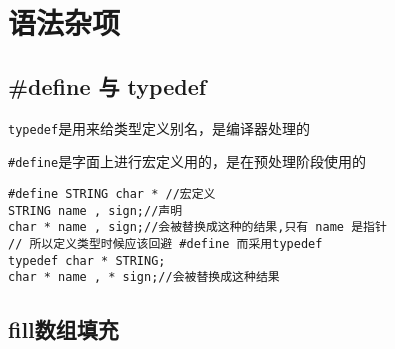 \section{语法杂项}

\subsection{#define 与 typedef}
\verb|typedef|是用来给类型定义别名，是编译器处理的

\verb|#define|是字面上进行宏定义用的，是在预处理阶段使用的
\begin{lstlisting}
#define STRING char * //宏定义
STRING name , sign;//声明
char * name , sign;//会被替换成这种的结果,只有 name 是指针
// 所以定义类型时候应该回避 #define 而采用typedef
typedef char * STRING;
char * name , * sign;//会被替换成这种结果
\end{lstlisting}

\subsection{fill数组填充}
